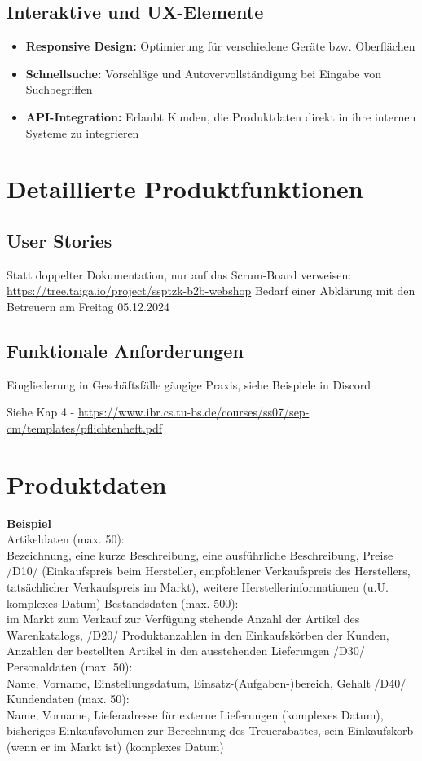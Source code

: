 \documentclass[%
	ngerman,
	12pt,
	a4paper,
	oneside,
	parskip=full
]{scrbook}
\begin{document}
\section{Interaktive und UX-Elemente}
\begin{itemize}
	\item \textbf{Responsive Design:} Optimierung für verschiedene Geräte bzw. Oberflächen
	\item \textbf{Schnellsuche:} Vorschläge und Autovervollständigung bei Eingabe von Suchbegriffen
	\item \textbf{API-Integration:} Erlaubt Kunden, die Produktdaten direkt in ihre internen Systeme zu integrieren
\end{itemize}

\chapter{Detaillierte Produktfunktionen}
\section{User Stories}
Statt doppelter Dokumentation, nur auf das Scrum-Board verweisen: \\
\url{https://tree.taiga.io/project/ssptzk-b2b-webshop}
\newline
Bedarf einer Abklärung mit den Betreuern am Freitag 05.12.2024

\section{Funktionale Anforderungen}
Eingliederung in Geschäftsfälle gängige Praxis, siehe Beispiele in Discord

Siehe Kap 4 - \url{https://www.ibr.cs.tu-bs.de/courses/ss07/sep-cm/templates/pflichtenheft.pdf}


\chapter{Produktdaten}
\textbf{Beispiel} \\
Artikeldaten (max. 50):\\
Bezeichnung, eine kurze Beschreibung, eine ausführliche Beschreibung, Preise
/D10/
(Einkaufspreis beim Hersteller, empfohlener Verkaufspreis des Herstellers,
tatsächlicher Verkaufspreis im Markt), weitere Herstellerinformationen (u.U.
komplexes Datum)
Bestandsdaten (max. 500):\\
im Markt zum Verkauf zur Verfügung stehende Anzahl der Artikel des Warenkatalogs,
/D20/
Produktanzahlen in den Einkaufskörben der Kunden, Anzahlen der bestellten Artikel in
den ausstehenden Lieferungen
/D30/ Personaldaten (max. 50):\\
Name, Vorname, Einstellungsdatum, Einsatz-(Aufgaben-)bereich, Gehalt
/D40/ Kundendaten (max. 50):\\
Name, Vorname, Lieferadresse für externe Lieferungen (komplexes Datum), bisheriges
Einkaufsvolumen zur Berechnung des Treuerabattes, sein Einkaufskorb (wenn er im
Markt ist) (komplexes Datum)
\end{document}
